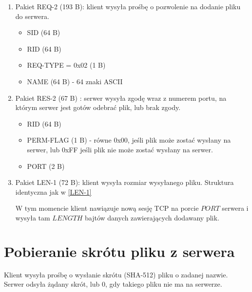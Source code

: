 \documentclass{article}
\begin{document}
	\begin{enumerate}
		\item Pakiet REQ-2 \label{REQ-2} (193 B): klient wysyła prośbę o pozwolenie na dodanie pliku do serwera. 
		\begin{itemize}
			\item SID (64 B)
			\item RID (64 B)
			\item REQ-TYPE = 0x02 (1 B)
			\item NAME (64 B) - 64 znaki ASCII
		\end{itemize}
	
		\item Pakiet RES-2 \label{RES-2} (67 B) : serwer wysyła zgodę wraz z numerem portu, na którym serwer jest gotów odebrać plik, lub brak zgody. 
		\begin{itemize}
			\item RID (64 B)
			\item PERM-FLAG (1 B) - równe 0x00, jeśli plik może zostać wysłany na serwer, lub 0xFF jeśli plik nie może zostać wysłany na serwer. 
			\item PORT (2 B) 
		\end{itemize}
	
		\item Pakiet LEN-1 (72 B): klient wysyła rozmiar wysyłanego pliku. Struktura identyczna jak w \ref{LEN-1}
	
		W tym momencie klient nawiązuje nową sesję TCP na porcie $PORT$ serwera i wysyła tam $LENGTH$ bajtów danych zawierających dodawany plik. 

	\end{enumerate}

	\section{Pobieranie skrótu pliku z serwera}
	Klient wysyła prośbę o wysłanie skrótu (SHA-512) pliku o zadanej nazwie. Serwer odsyła żądany skrót, lub 0, gdy takiego pliku nie ma na serwerze. 
	
\end{document}
